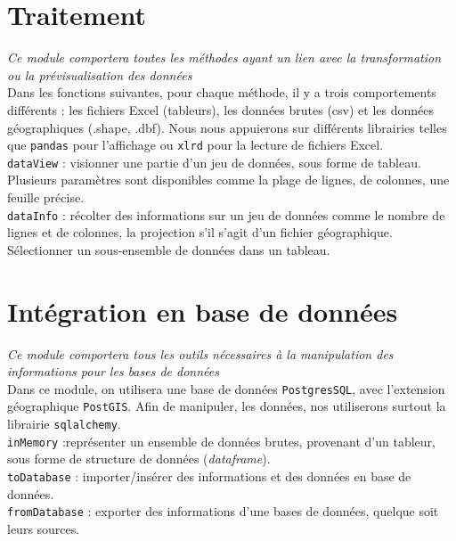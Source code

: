 \documentclass[french,12pt]{report}
\begin{document}
\begin{normalsize}
 


   \section{Traitement}
   
\noindent \textit{Ce module comportera toutes les méthodes ayant un lien avec la transformation ou la prévisualisation des données}\\

   Dans les fonctions suivantes, pour chaque méthode, il y a trois comportements différents : les fichiers Excel (tableurs), les données brutes (csv) et les données géographiques (.shape, .dbf). Nous nous appuierons sur différents librairies telles que \texttt{pandas} pour l’affichage ou \texttt{xlrd} pour la lecture de fichiers Excel.\\
   
   \texttt{dataView} : visionner une partie d’un jeu de données, sous forme de tableau. Plusieurs paramètres sont disponibles comme la plage de lignes, de colonnes, une feuille précise.\\
   
   \texttt{dataInfo} : récolter des informations sur un jeu de données comme le nombre de lignes et de colonnes, la projection s’il s’agit d’un fichier géographique. Sélectionner un sous-ensemble de données dans un tableau.
   
   \section{Intégration en base de données}
\noindent \textit{Ce module comportera tous les outils nécessaires à la manipulation des informations pour les bases de données}\\   
   
  Dans ce module, on utilisera une base de données \texttt{PostgresSQL}, avec l’extension géographique \texttt{PostGIS}. Afin de manipuler, les données, nos utiliserons surtout la librairie \texttt{sqlalchemy}.\\
  
     \texttt{inMemory} :représenter un ensemble de données brutes, provenant d’un tableur, sous forme de structure de données (\textit{dataframe}).\\
     
     \texttt{toDatabase} : importer/insérer des informations et des données en base de données.\\
     
     \texttt{fromDatabase} : exporter des informations d’une bases de données, quelque soit leurs sources.\\


\end{normalsize}
\end{document}
